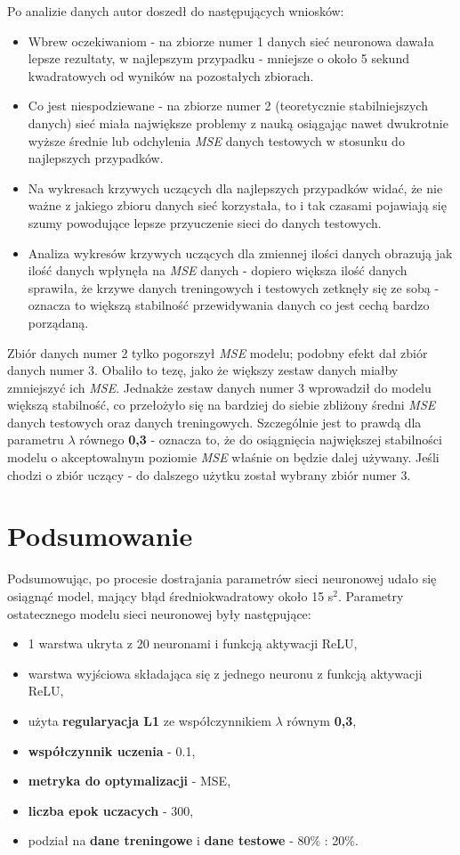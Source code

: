 \documentclass[12pt]{aghdpl}
\begin{document}
		Po analizie danych autor doszedł do następujących wniosków:
		\begin{itemize}
		\item Wbrew oczekiwaniom - na zbiorze numer 1 danych sieć neuronowa dawała lepsze rezultaty, w najlepszym przypadku - mniejsze o około 5 sekund kwadratowych od wyników na pozostałych zbiorach.
		\item Co jest niespodziewane - na zbiorze numer 2 (teoretycznie stabilniejszych danych) sieć miała największe problemy z nauką osiągając nawet dwukrotnie wyższe średnie lub odchylenia \textit{MSE} danych testowych w stosunku do najlepszych przypadków.
		\item Na wykresach krzywych uczących dla najlepszych przypadków widać, że nie ważne z jakiego zbioru danych sieć korzystała, to i tak czasami pojawiają się szumy powodujące lepsze przyuczenie sieci do danych testowych.
		\item Analiza wykresów krzywych uczących dla zmiennej ilości danych obrazują jak ilość danych wpłynęła na \textit{MSE} danych - dopiero większa ilość danych sprawiła, że krzywe danych treningowych i testowych zetknęły się ze sobą - oznacza to większą stabilność przewidywania danych co jest cechą bardzo porządaną.
		\end{itemize}	
		
		Zbiór danych numer 2 tylko pogorszył \textit{MSE} modelu; podobny efekt dał zbiór danych numer 3. Obaliło to tezę, jako że większy zestaw danych miałby zmniejszyć ich \textit{MSE}. Jednakże zestaw danych numer 3 wprowadził do modelu większą stabilność, co przełożyło się na bardziej do siebie zbliżony średni \textit{MSE} danych testowych oraz danych treningowych. Szczególnie jest to prawdą dla parametru $\lambda$ równego \textbf{0,3} - oznacza to, że do osiągnięcia największej stabilności modelu o akceptowalnym poziomie \textit{MSE} właśnie on będzie dalej używany. Jeśli chodzi o zbiór uczący - do dalszego użytku został wybrany zbiór numer 3.
		
		\section{Podsumowanie}	
		Podsumowując, po procesie dostrajania parametrów sieci neuronowej udało się osiągnąć model, mający błąd średniokwadratowy około 15 s$^2$. Parametry ostatecznego modelu sieci neuronowej były następujące:
		\begin{itemize}
		\item 1 warstwa ukryta z 20 neuronami i funkcją aktywacji ReLU,
		\item warstwa wyjściowa składająca się z jednego neuronu z funkcją aktywacji ReLU,
		\item użyta \textbf{regularyacja L1} ze współczynnikiem $\lambda$ równym \textbf{0,3},
		\item \textbf{współczynnik uczenia} - 0.1,
		\item \textbf{metryka do optymalizacji} - MSE,
		\item \textbf{liczba epok uczacych} - 300,
		\item podział na \textbf{dane treningowe} i \textbf{dane testowe} - 80\% : 20\%.
		\end{itemize}
		
\end{document}
